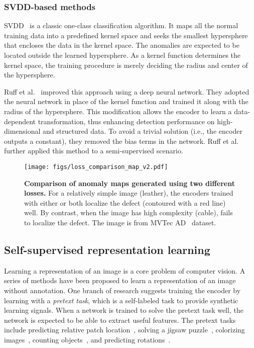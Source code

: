 \documentclass[runningheads]{llncs}
\begin{document}
\subsubsection{SVDD-based methods} SVDD~\cite{svdd} is a classic one-class classification algorithm.
It maps all the normal training data into a predefined kernel space and seeks the smallest hypersphere that encloses the data in the kernel space.
The anomalies are expected to be located outside the learned hypersphere.
As a kernel function determines the kernel space, the training procedure is merely deciding the radius and center of the hypersphere.

Ruff et al.~\cite{deepSVDD} improved this approach using a deep neural network.
They adopted the neural network in place of the kernel function and trained it along with the radius of the hypersphere.
This modification allows the encoder to learn a data-dependent transformation, thus enhancing detection performance on high-dimensional and structured data.
To avoid a trivial solution (i.e., the encoder outputs a constant), they removed the bias terms in the network.
Ruff et al.~\cite{deep_sad} further applied this method to a semi-supervised scenario.

\begin{figure}[t]
    \centering
    \texttt{[image: figs/loss\_comparison\_map\_v2.pdf]}
    \caption{
    \textbf{Comparison of anomaly maps generated using two different losses.}
    For a relatively simple image (leather), the encoders trained with either  or  both localize the defect (contoured with a red line) well. By contrast, when the image has high complexity (cable),  fails to localize the defect. The image is from MVTec AD~\cite{mvtecad} dataset.
    }
    \label{fig:ablation_loss_map}
    \vspace{-5pt}
\end{figure}
 
\subsection{Self-supervised representation learning}
Learning a representation of an image is a core problem of computer vision.
A series of methods have been proposed to learn a representation of an image without annotation.
One branch of research suggests training the encoder by learning with a \textit{pretext task}, which is a self-labeled task to provide synthetic learning signals.
When a network is trained to solve the pretext task well, the network is expected to be able to extract useful features.
The pretext tasks include predicting relative patch location~\cite{patch_location}, solving a jigsaw puzzle~\cite{jigsaw}, colorizing images~\cite{colorization}, counting objects~\cite{count}, and predicting rotations~\cite{rotation}.
\end{document}
